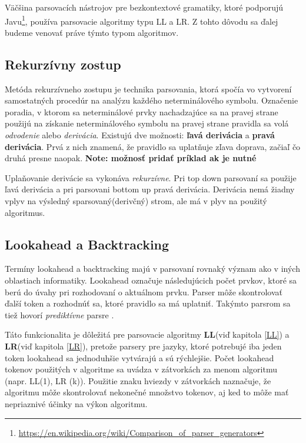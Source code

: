 Väčšina parsovacích nástrojov pre bezkontextové gramatiky, ktoré podporujú Javu\footnote{\url{https://en.wikipedia.org/wiki/Comparison_of_parser_generators}}, používa parsovacie algoritmy typu LL a LR. Z tohto dôvodu sa ďalej budeme venovať práve týmto typom algoritmov.

\subsection{Rekurzívny zostup}\label{recursive-descent}
Metóda rekurzívneho zostupu je technika parsovania, ktorá spočía vo vytvorení samostatných procedúr na analýzu každého neterminálového symbolu. \cite{CVUT:program_language} Označenie poradia, v ktorom sa neterminálové prvky nachadzajúce sa na pravej strane použijú na získanie neterminálového symbolu na pravej strane pravidla sa volá \textit{odvodenie} alebo \textit{derivácia}. Existujú dve možnosti: \textbf{ľavá derivácia} a \textbf{pravá derivácia}. Prvá z nich znamená, že pravidlo sa uplatňuje zľava doprava, začiaľ čo druhá presne naopak. 
\textbf{Note: možnosť pridať príklad ak je nutné}

Uplaňovanie derivácie sa vykonáva \textit{rekurzívne}. Pri top down parsovaní sa použije ľavá derivácia a pri parsovani bottom up pravá derivácia. Derivácia nemá žiadny vplyv na výsledný sparsovaný(derivčný) strom, ale má v plyv na použitý algoritmus.

\subsection{Lookahead a Backtracking}
Termíny lookahead a backtracking majú v parsovaní rovnaký význam ako v iných oblastiach informatiky. Lookahead označuje následujúcich počet prvkov, ktoré sa berú do úvahy pri rozhodovaní o aktuálnom prvku. Parser môže skontrolovať ďalší token a rozhodnúť sa, ktoré pravidlo sa má uplatniť. Takýmto parsrom sa tiež hovorí \textit{prediktívne} parsre \cite{haberman:parsing_demystified}.

Táto funkcionalita je dôležitá pre parsovacie algoritmy \textbf{LL}(viď kapitola \ref{LL}) a \textbf{LR}(viď kapitola \ref{LR}), pretože parsery pre jazyky, ktoré potrebujé iba jeden token lookahead sa jednoduhšie vytvárajú a sú rýchlejšie. Počet lookahead tokenov použitých v algoritme sa uvádza v zátvorkách za menom algoritmu (napr. LL(1), LR (k)). Použitie znaku hviezdy v zátvorkách naznačuje, že algoritmu môže skontrolovať nekonečné množstvo tokenov, aj ked to môže mať nepriaznivé účinky na výkon algoritmu.\cite{tomassetti:parsing}

